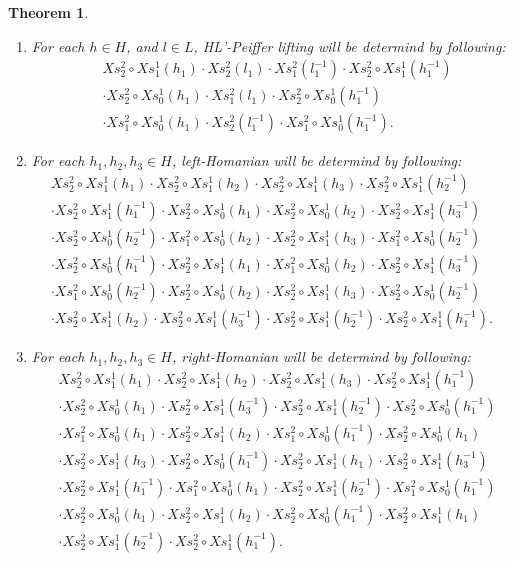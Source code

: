 \documentclass{tac}
\newtheorem{theorem}{Theorem}
\begin{document}
\begin{theorem}
\begin{enumerate}[label=(\roman*)]
\item For each $h \in H$, and $l \in L$, HL'-Peiffer lifting will be determind by following:
 \begin{align*}
 &Xs^2_2\circ Xs^1_1(h_1)\cdot Xs^2_2(l_1)\cdot Xs^2_1(l_1^{-1})\cdot Xs^2_2\circ Xs^1_1(h_1^{-1})\\
 &\cdot Xs^2_2\circ Xs^1_0(h_1)\cdot Xs^2_1(l_1)\cdot Xs^2_2\circ Xs^1_0(h_1^{-1})\\
 &\cdot Xs^2_1\circ Xs^1_0(h_1)\cdot Xs^2_2(l_1^{-1})\cdot Xs^2_1\circ Xs^1_0(h_1^{-1}).
 \end{align*}

\item For each $h_1, h_2, h_3 \in H$, left-Homanian will be determind by following:
\begin{align*}
Xs^2_2\circ Xs^1_1(h_1)\cdot Xs^2_2\circ Xs^1_1(h_2)\cdot Xs^2_2\circ Xs^1_1(h_3)\cdot Xs^2_2\circ Xs^1_1(h_2^{-1})\\
\cdot Xs^2_2\circ Xs^1_1(h_1^{-1})\cdot Xs^2_2\circ Xs^1_0(h_1)\cdot Xs^2_2\circ Xs^1_0(h_2)\cdot Xs^2_2\circ Xs^1_1(h_3^{-1})\\
\cdot Xs^2_2\circ Xs^1_0(h_2^{-1})\cdot Xs^2_1\circ Xs^1_0(h_2)\cdot Xs^2_2\circ Xs^1_1(h_3)\cdot Xs^2_1\circ Xs^1_0(h_2^{-1})\\
\cdot Xs^2_2\circ Xs^1_0(h_1^{-1})\cdot Xs^2_2\circ Xs^1_1(h_1)\cdot Xs^2_1\circ Xs^1_0(h_2)\cdot Xs^2_2\circ Xs^1_1(h_3^{-1})\\
\cdot Xs^2_1\circ Xs^1_0(h_2^{-1})\cdot Xs^2_2\circ Xs^1_0(h_2)\cdot Xs^2_2\circ Xs^1_1(h_3)\cdot Xs^2_2\circ Xs^1_0(h_2^{-1})\\
\cdot Xs^2_2\circ Xs^1_1(h_2)\cdot Xs^2_2\circ Xs^1_1(h_3^{-1})\cdot Xs^2_2\circ Xs^1_1(h_2^{-1})\cdot Xs^2_2\circ Xs^1_1(h_1^{-1}).
\end{align*}

\item For each $h_1, h_2, h_3 \in H$, right-Homanian will be determind by following:
\begin{align*}
&Xs^2_2\circ Xs^1_1(h_1)\cdot Xs^2_2\circ Xs^1_1(h_2)\cdot Xs^2_2\circ Xs^1_1(h_3)\cdot Xs^2_2\circ Xs^1_1(h_1^{-1})\\
&\cdot Xs^2_2\circ Xs^1_0(h_1)\cdot Xs^2_2\circ Xs^1_1(h_3^{-1})\cdot Xs^2_2\circ Xs^1_1(h_2^{-1})\cdot Xs^2_2\circ Xs^1_0(h_1^{-1})\\
&\cdot Xs^2_1\circ Xs^1_0(h_1)\cdot Xs^2_2\circ Xs^1_1(h_2)\cdot Xs^2_1\circ Xs^1_0(h_1^{-1})\cdot Xs^2_2\circ Xs^1_0(h_1)\\
&\cdot Xs^2_2\circ Xs^1_1(h_3)\cdot Xs^2_2\circ Xs^1_0(h_1^{-1})\cdot Xs^2_2\circ Xs^1_1(h_1)\cdot Xs^2_2\circ Xs^1_1(h_3^{-1})\\
&\cdot Xs^2_2\circ Xs^1_1(h_1^{-1})\cdot Xs^2_1\circ Xs^1_0(h_1)\cdot Xs^2_2\circ Xs^1_1(h_2^{-1})\cdot Xs^2_1\circ Xs^1_0(h_1^{-1})\\
&\cdot Xs^2_2\circ Xs^1_0(h_1)\cdot Xs^2_2\circ Xs^1_1(h_2)\cdot Xs^2_2\circ Xs^1_0(h_1^{-1})\cdot Xs^2_2\circ Xs^1_1(h_1)\\
&\cdot Xs^2_2\circ Xs^1_1(h_2^{-1})\cdot Xs^2_2\circ Xs^1_1(h_1^{-1}).
\end{align*}


\end{enumerate}
\end{theorem}
\end{document}
